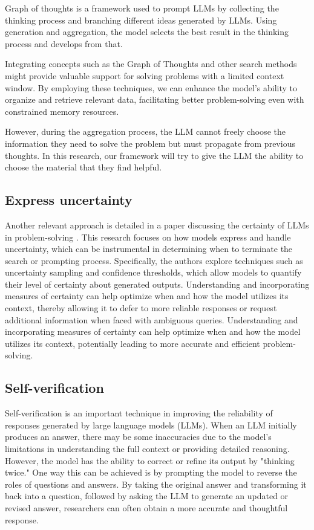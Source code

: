 \documentclass{article}
\begin{document}
Graph of thoughts \cite{Besta_2024} is a framework used to prompt LLMs by collecting the thinking process and branching different ideas generated by LLMs. Using generation and aggregation, the model selects the best result in the thinking process and develops from that.  

Integrating concepts such as the Graph of Thoughts and other search methods might provide valuable support for solving problems with a limited context window. By employing these techniques, we can enhance the model's ability to organize and retrieve relevant data, facilitating better problem-solving even with constrained memory resources.

However, during the aggregation process, the LLM cannot freely choose the information they need to solve the problem but must propagate from previous thoughts. In this research, our framework will try to give the LLM the ability to choose the material that they find helpful.

\subsection{Express uncertainty}

Another relevant approach is detailed in a paper discussing the certainty of LLMs in problem-solving \cite{lin2022teachingmodelsexpressuncertainty}. This research focuses on how models express and handle uncertainty, which can be instrumental in determining when to terminate the search or prompting process. Specifically, the authors explore techniques such as uncertainty sampling and confidence thresholds, which allow models to quantify their level of certainty about generated outputs. Understanding and incorporating measures of certainty can help optimize when and how the model utilizes its context, thereby allowing it to defer to more reliable responses or request additional information when faced with ambiguous queries. Understanding and incorporating measures of certainty can help optimize when and how the model utilizes its context, potentially leading to more accurate and efficient problem-solving.

\subsection{Self-verification}

Self-verification \cite{weng2023largelanguagemodelsbetter} is an important technique in improving the reliability of responses generated by large language models (LLMs). When an LLM initially produces an answer, there may be some inaccuracies due to the model's limitations in understanding the full context or providing detailed reasoning. However, the model has the ability to correct or refine its output by "thinking twice." One way this can be achieved is by prompting the model to reverse the roles of questions and answers. By taking the original answer and transforming it back into a question, followed by asking the LLM to generate an updated or revised answer, researchers can often obtain a more accurate and thoughtful response.
\end{document}
